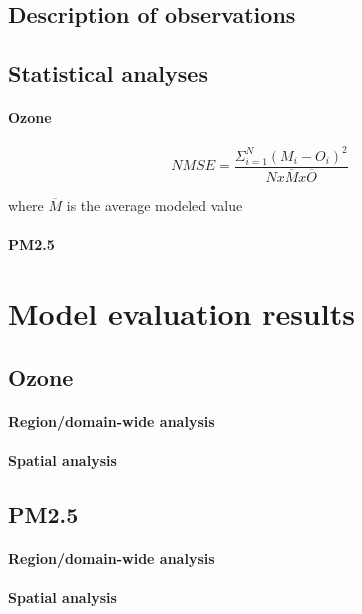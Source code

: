   \subsection{Description of observations}
  
  \subsection{Statistical analyses}
   \paragraph{Ozone}
   
\begin {equation}
 NMSE = \frac{\Sigma_{i=1}^N (M_i - O_i)^2}{N x \overline{M} x \overline{O}}
\end {equation}  

where $\overline{M}$ is the average modeled value
   \paragraph{PM2.5}

\section{Model evaluation results}
\label{sec:results}
 
  \subsection{Ozone}
    \paragraph{Region/domain-wide analysis}
  
    \paragraph{Spatial analysis}
  \subsection{PM2.5}
   \paragraph{Region/domain-wide analysis}
  
  \paragraph{Spatial analysis}
  
